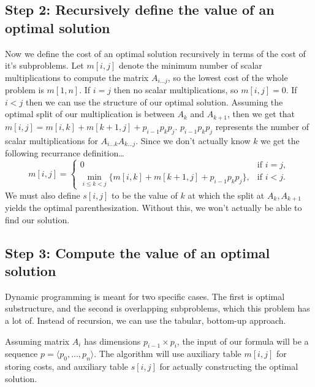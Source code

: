 \documentclass[11pt]{article}
\theoremstyle{definition}
\begin{document}
\subsection*{Step 2: Recursively define the value of an optimal solution}
Now we define the cost of an optimal solution recursively in terms of the cost of it's subproblems.
Let \(m[i,j]\) denote the minimum number of scalar multiplications to compute the matrix 
\(A_{i \dots j}\), so the lowest cost of the whole problem is \(m[1,n]\).  If \(i=j\) then no 
scalar multiplications, so \(m[i,j] = 0\).  If \(i < j\) then we can use the structure of our 
optimal solution.  Assuming the optimal split of our multiplication is between \(A_k\) and 
\(A_{k+1}\), then we get that \(m[i,j] = m[i,k] + m[k+1,j] + p_{i-1}p_kp_j\). \(p_{i-1}p_kp_j\) 
represents the number of scalar multiplications for \(A_{i \dots k}A_{k \dots j}\).  Since we 
don't actually know \(k\) we get the following recurrance definition\dots
\[m[i,j] = \begin{cases}
  0 & \text{if } i = j, \\
  \displaystyle\min_{i \leq k < j} \{m[i,k] + m[k+1,j] + p_{i-1}p_kp_j\}, & \text{if } i < j.
\end{cases}\]
We must also define \(s[i,j]\) to be the value of \(k\) at which the split at \(A_k,A_{k+1}\) 
yields the optimal parenthesization.  Without this, we won't actually be able to find our solution.

\subsection*{Step 3: Compute the value of an optimal solution}
Dynamic programming is meant for two specific cases.  The first is optimal substructure, and the 
second is overlapping subproblems, which this problem has a lot of.  Instead of recursion, we can 
use the tabular, bottom-up approach.  

Assuming matrix \(A_i\) has dimensions \(p_{i-1} \times p_i\), the input of our 
 formula will be a sequence \(p = \langle p_0, \dots, p_n \rangle\).  
The algorithm will use auxiliary table \(m[i,j]\) for storing costs, and auxiliary table  \(s[i,j]\)
for actually constructing the optimal solution. 
\end{document}
